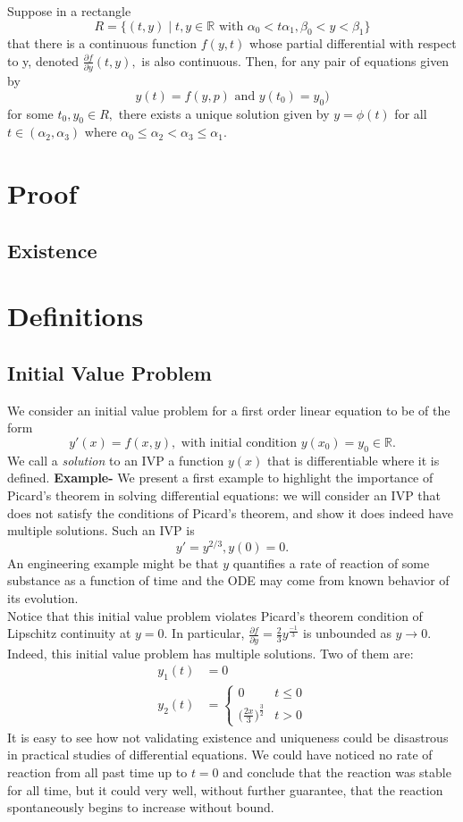 \documentclass[11 pt]{article}
\begin{document}
\begin{solution}
Suppose in a rectangle $$R=\{(t, y)\mid t, y\in\mathbb R \text{ with } \alpha_0<t\alpha_1, \beta_0<y<\beta_1\}$$ that there is a continuous function $f(y, t)$ whose partial differential with respect to y, denoted $\frac{\partial f}{\partial y} (t, y),$ is also continuous. Then, for any pair of equations given by $$y(t)=f(y, p) \text{ and } y(t_0)=y_0)$$  for some $t_0, y_0\in R,$ there exists a unique solution given by $y=\phi(t)$ for all $t\in(\alpha_2, \alpha_3)$ where $\alpha_0\leq\alpha_2<\alpha_3\leq\alpha_1.$
\section{Proof}

\subsection{Existence}
\section{Definitions}
\subsection{Initial Value Problem}
We consider an initial value problem for a first order linear equation to be of the form 
    \[y'(x)=f(x,y), \text{ with initial condition } y(x_0)=y_0\in\mathbb{R}.\]
We call a \emph{solution} to an IVP a function $y(x)$ that is differentiable where it is defined.
\textbf{Example- } We present a first example to highlight the importance of Picard's theorem in solving differential equations: we will consider an IVP that does not satisfy the conditions of Picard's theorem, and show it does indeed have multiple solutions.
Such an IVP is \[
y'=y^{2/3}, y(0)=0
.\]
An engineering example might be that $y$ quantifies a rate of reaction of some substance as a function of time and the ODE may come from known behavior of its evolution.\\
Notice that this initial value problem violates Picard's theorem condition of Lipschitz continuity at  $y=0$. In particular,  $\frac{\partial f}{\partial y}=\frac{2}{3}y^{\frac{-1}{3}}$ is unbounded as $y\to 0$.\\
Indeed, this initial value problem has multiple solutions. Two of them are:
\begin{align}
	y_1(t) & =0\\
	y_2(t) & = \begin{cases}
		0 & t\leq 0 \\
		\big(\frac{2x}{3}\big)^{\frac{3}{2}} & t>0
		\end{cases}
\end{align}
It is easy to see how not validating existence and uniqueness could be disastrous in practical studies of differential equations. We could have noticed no rate of reaction from all past time up to $t=0$ and conclude that the reaction was stable for all time, but it could very well, without further guarantee, that the reaction spontaneously begins to increase without bound.

\end{solution}
\end{document}

